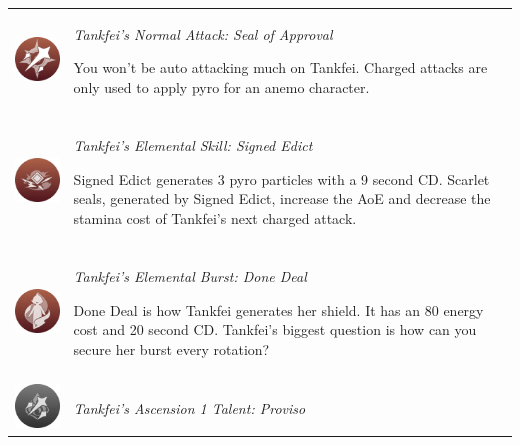 \documentclass[11pt]{article}
\begin{document}
\begin{tabular}{m{} m{} }
\includegraphics[scale = 0.27]{NormalAttack.png}  & \textit{Tankfei's Normal Attack: Seal of Approval} 

You won't be auto attacking much on Tankfei. Charged attacks are only used to apply pyro for an anemo character.\\
\\
\includegraphics[scale = 0.27]{ElementalSkill.png} & \textit{Tankfei's Elemental Skill: Signed Edict} 

Signed Edict generates 3 pyro particles with a 9 second CD. Scarlet seals, generated by Signed Edict, increase the AoE and decrease the stamina cost of Tankfei's next charged attack. \\
\\
\includegraphics[scale = 0.27]{ElementalBurst.png} & \textit{Tankfei's Elemental Burst: Done Deal} 

Done Deal is how Tankfei generates her shield. It has an 80 energy cost and 20 second CD. Tankfei's biggest question is how can you secure her burst every rotation? \\
\\
\includegraphics[scale = 0.27]{Ascension1_Greyscale.png} & \textit{Tankfei's Ascension 1 Talent: Proviso} 


\end{tabular}
\end{document}
